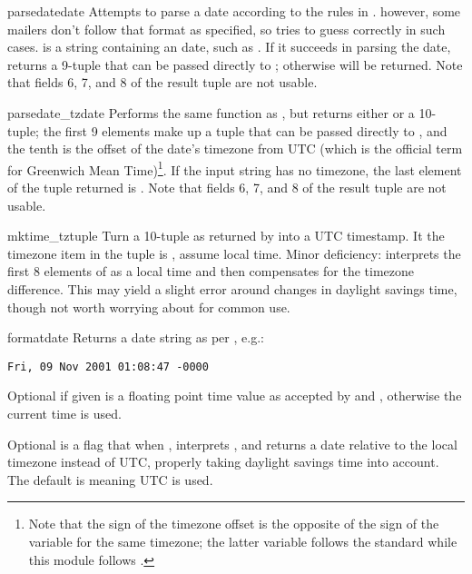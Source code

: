 \begin{funcdesc}{parsedate}{date}
Attempts to parse a date according to the rules in .
however, some mailers don't follow that format as specified, so
 tries to guess correctly in such cases. 
 is a string containing an  date, such as 
.  If it succeeds in parsing
the date,  returns a 9-tuple that can be passed
directly to ; otherwise  will be
returned.  Note that fields 6, 7, and 8 of the result tuple are not
usable.
\end{funcdesc}

\begin{funcdesc}{parsedate_tz}{date}
Performs the same function as , but returns
either  or a 10-tuple; the first 9 elements make up a tuple
that can be passed directly to , and the tenth
is the offset of the date's timezone from UTC (which is the official
term for Greenwich Mean Time)\footnote{Note that the sign of the timezone
offset is the opposite of the sign of the 
variable for the same timezone; the latter variable follows the
\POSIX{} standard while this module follows .}.  If the input
string has no timezone, the last element of the tuple returned is
.  Note that fields 6, 7, and 8 of the result tuple are not
usable.
\end{funcdesc}

\begin{funcdesc}{mktime_tz}{tuple}
Turn a 10-tuple as returned by  into a UTC
timestamp.  It the timezone item in the tuple is , assume
local time.  Minor deficiency:  interprets the
first 8 elements of  as a local time and then compensates
for the timezone difference.  This may yield a slight error around
changes in daylight savings time, though not worth worrying about for
common use.
\end{funcdesc}

\begin{funcdesc}{formatdate}{}
Returns a date string as per , e.g.:

\begin{verbatim}
Fri, 09 Nov 2001 01:08:47 -0000
\end{verbatim}

Optional  if given is a floating point time value as
accepted by  and ,
otherwise the current time is used.

Optional  is a flag that when , interprets
, and returns a date relative to the local timezone
instead of UTC, properly taking daylight savings time into account.
The default is  meaning UTC is used.
\end{funcdesc}


